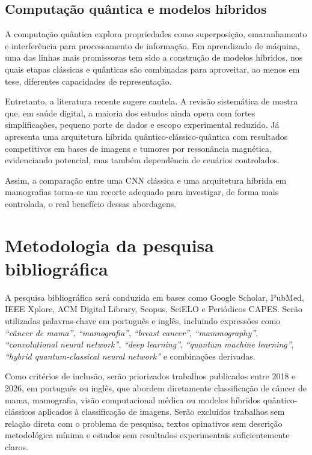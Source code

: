\documentclass[
    12pt,
    openright,
    oneside,
    a4paper,
    english,
    brazil
]{abntex2}
\begin{document}
\subsection{Computação quântica e modelos híbridos}

A computação quântica explora propriedades como superposição, emaranhamento e interferência para processamento de informação. Em aprendizado de máquina, uma das linhas mais promissoras tem sido a construção de modelos híbridos, nos quais etapas clássicas e quânticas são combinadas para aproveitar, ao menos em tese, diferentes capacidades de representação.

Entretanto, a literatura recente sugere cautela. A revisão sistemática de  mostra que, em saúde digital, a maioria dos estudos ainda opera com fortes simplificações, pequeno porte de dados e escopo experimental reduzido. Já  apresenta uma arquitetura híbrida quântico-clássico-quântica com resultados competitivos em bases de imagens e tumores por ressonância magnética, evidenciando potencial, mas também dependência de cenários controlados.

Assim, a comparação entre uma CNN clássica e uma arquitetura híbrida em mamografias torna-se um recorte adequado para investigar, de forma mais controlada, o real benefício dessas abordagens.

\section{Metodologia da pesquisa bibliográfica}
\label{sec:metodologia_biblio}

A pesquisa bibliográfica será conduzida em bases como Google Scholar, PubMed, IEEE Xplore, ACM Digital Library, Scopus, SciELO e Periódicos CAPES. Serão utilizadas palavras-chave em português e inglês, incluindo expressões como \textit{``câncer de mama''}, \textit{``mamografia''}, \textit{``breast cancer''}, \textit{``mammography''}, \textit{``convolutional neural network''}, \textit{``deep learning''}, \textit{``quantum machine learning''}, \textit{``hybrid quantum-classical neural network''} e combinações derivadas.

Como critérios de inclusão, serão priorizados trabalhos publicados entre 2018 e 2026, em português ou inglês, que abordem diretamente classificação de câncer de mama, mamografia, visão computacional médica ou modelos híbridos quântico-clássicos aplicados à classificação de imagens. Serão excluídos trabalhos sem relação direta com o problema de pesquisa, textos opinativos sem descrição metodológica mínima e estudos sem resultados experimentais suficientemente claros.
\end{document}
